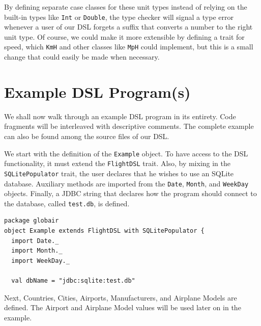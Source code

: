 \documentclass[a4paper]{article}
\newcommand{\cc}[1]{\texttt{#1}}
\begin{document}
By defining separate case classes for these unit types instead of relying on the built-in types like \cc{Int} or \cc{Double}, the type checker will signal a type error whenever a user of our DSL forgets a suffix that converts a number to the right unit type.
Of course, we could make it more extensible by defining a trait for speed, which \cc{KmH} and other classes like \cc{MpH} could implement, but this is a small change that could easily be made when necessary.

\clearpage
\section{Example DSL Program(s)}
\label{sec:example-dsl-programs}


We shall now walk through an example DSL program in its entirety.
Code fragments will be interleaved with descriptive comments.
The complete example can also be found among the source files of our DSL\@.


We start with the definition of the \cc{Example} object.
To have access to the DSL functionality, it must extend the \cc{FlightDSL} trait.
Also, by mixing in the \cc{SQLite\-Populator} trait, the user declares that he wishes to use an SQLite database.
Auxiliary methods are imported from the \cc{Date}, \cc{Month}, and \cc{WeekDay} objects.
Finally, a JDBC string that declares how the program should connect to the database, called \cc{test.db}, is defined.

\begin{lstlisting}
package globair
object Example extends FlightDSL with SQLitePopulator {
  import Date._
  import Month._
  import WeekDay._

  val dbName = "jdbc:sqlite:test.db"
\end{lstlisting}

Next, Countries, Cities, Airports, Manufacturers, and Airplane Models are defined.
The Airport and Airplane Model values will be used later on in the example.
\end{document}
